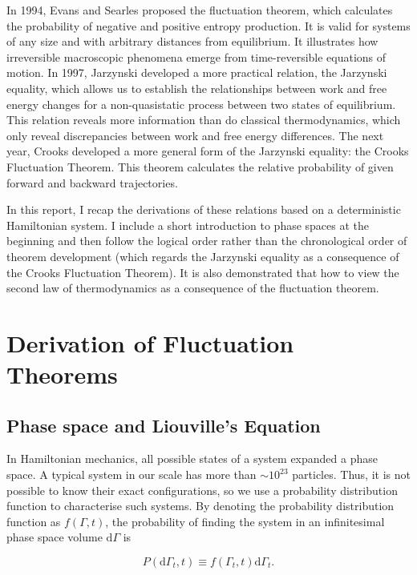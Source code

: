 \documentclass[ reprint, amsmath,amssymb, aps,]{revtex4-1}
\begin{document}
In 1994, Evans and Searles\cite{evans1994equilibrium} proposed the fluctuation theorem, which calculates the probability of negative and positive entropy production. It is valid for systems of any size and with arbitrary distances from equilibrium. It illustrates how irreversible macroscopic phenomena emerge from time-reversible equations of motion. In 1997, Jarzynski\cite{Jarzynski1997} developed a more practical relation, the Jarzynski equality, which allows us to establish the relationships between work and free energy changes for a non-quasistatic process between two states of equilibrium. This relation reveals more information than do classical thermodynamics, which only reveal discrepancies between work and free energy differences.
The next year, Crooks\cite{crooks1998nonequilibrium} developed a more general form of the Jarzynski equality: the Crooks Fluctuation Theorem. This theorem calculates the relative probability of given forward and backward trajectories.


In this report, I recap the derivations of these relations based on a deterministic Hamiltonian system. I include a short introduction to phase spaces at the beginning and then follow the logical order rather than the chronological order of theorem development (which regards the Jarzynski equality as a consequence of the Crooks Fluctuation Theorem). It is also  demonstrated that how to view the second law of thermodynamics as a consequence of the fluctuation theorem. 

\section{Derivation of Fluctuation Theorems}

\subsection{Phase space and Liouville's Equation}
In Hamiltonian mechanics, all possible states of a system expanded a phase space. A typical system in our scale has more than $\sim 10^{23}$ particles. Thus, it is not possible to know their exact configurations, so we use a probability distribution function to characterise such systems. By denoting the probability distribution function as $f(\Gamma,t)$, the probability of finding the system in an infinitesimal phase space volume $\mathrm{d}\Gamma$ is 

\begin{equation}
P(\mathrm{d}\Gamma_t,t)\equiv 
f(\Gamma_t,t)\mathrm{d}\Gamma_t.
\end{equation}
\end{document}
